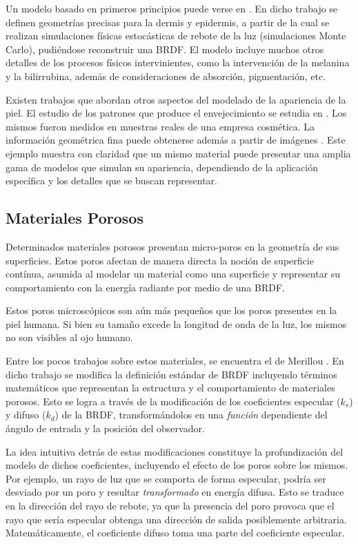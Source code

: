 Un modelo basado en primeros principios puede verse en \cite{Krishnaswamy2004}.
En dicho trabajo se definen geometrías precisas para la dermis y epidermis, a partir de la cual se realizan simulaciones físicas estocásticas de rebote de la luz (simulaciones Monte Carlo), pudiéndose reconstruir una BRDF.
El modelo incluye muchos otros detalles de los procesos físicos intervinientes, como la intervención de la melanina y la bilirrubina, además de consideraciones de absorción, pigmentación, etc.

Existen trabajos que abordan otros aspectos del modelado de la apariencia de la piel.
El estudio de los patrones que produce el envejecimiento se estudia en \cite{Boissieux2000}.
Los mismos fueron medidos en muestras reales de una empresa cosmética.
La información geométrica fina puede obtenerse además a partir de imágenes \cite{Golovinskiy2006}.
Este ejemplo muestra con claridad que un mismo material puede presentar una amplia gama de modelos que simulan su apariencia, dependiendo de la aplicación específica y los detalles que se buscan representar.

\subsection{Materiales Porosos}

Determinados materiales porosos presentan micro-poros en la geometría de sus superficies.
Estos poros afectan de manera directa la noción de superficie contínua, asumida al modelar un material como una superficie y representar su comportamiento con la energía radiante por medio de una BRDF.

Estos poros microscópicos son aún más pequeños que los poros presentes en la piel humana.
Si bien su tamaño excede la longitud de onda de la luz, los mismos no son visibles al ojo humano.

Entre los pocos trabajos sobre estos materiales, se encuentra el de Merillou \cite{Merillou2000}.
En dicho trabajo se modifica la definición estándar de BRDF incluyendo términos matemáticos que representan la estructura y el comportamiento de materiales porosos.
Esto se logra a través de la modificación de los coeficientes especular ($k_{s}$) y difuso ($k_{d}$) de la BRDF, transformándolos en una {\em función} dependiente del ángulo de entrada y la posición del observador.

La idea intuitiva detrás de estas modificaciones constituye la profundización del modelo de dichos coeficientes, incluyendo el efecto de los poros sobre los mismos.
Por ejemplo, un rayo de luz que se comporta de forma especular, podría ser desviado por un poro y resultar {\em transformado} en energía difusa.
Esto se traduce en la dirección del rayo de rebote, ya que la presencia del poro provoca que el rayo que sería especular obtenga una dirección de salida posiblemente arbitraria.
Matemáticamente, el coeficiente difuso toma una parte del coeficiente especular.

